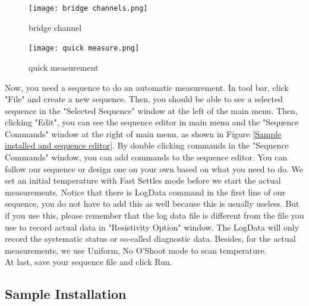 \documentclass{article}
\begin{document}
        \begin{figure}[H]
            \centering
            \texttt{[image: bridge channels.png]}
            \caption{bridge channel}
            \label{bridge channel}
        \end{figure}

        
        \begin{figure}[H]
            \centering
            \texttt{[image: quick measure.png]}
            \caption{quick measurement}
            \label{quick measurement}
        \end{figure}

        Now, you need a sequence to do an automatic measurement. In tool bar, click "File" and create a new sequence. Then, you should be able to see a selected sequence in the "Selected Sequence" window at the left of the main menu. Then, clicking "Edit", you can see the sequence editor in main menu and the "Sequence Commands" window at the right of main menu, as shown in Figure \ref{Sample installed and sequence editor}. By double clicking commands in the "Sequence Commands" window, you can add commands to the sequence editor. You can follow our sequence or design one on your own based on what you need to do. We set an initial temperature with Fast Settles mode before we start the actual measurements. Notice that there is LogData command in the first line of our sequence, you do not have to add this as well because this is usually useless. But if you use this, please remember that the log data file is different from the file you use to record actual data in "Resistivity Option" window. The LogData will only record the systematic status or so-called diagnostic data. Besides, for the actual measurements, we use Uniform, No O'Shoot mode to scan temperature.\\
        At last, save your sequence file and click Run.\\
    
    \subsection{Sample Installation}
    
\end{document}
